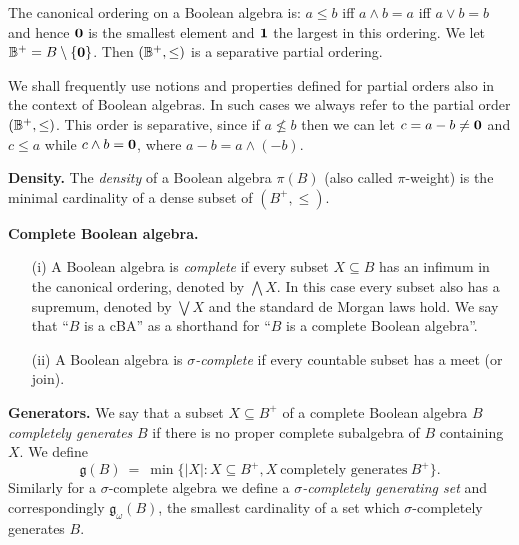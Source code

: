The canonical ordering on a Boolean algebra is: $a\leq b$ iff $a\wedge b=a$ iff $a\vee b = b$ and hence $\hbox{\bf 0}$ is the smallest element and $\hbox{\bf 1}$ the largest in this ordering.
We let ${\mathbb B}^{+}=B\setminus\{\hbox{\bf 0}\}$. Then $({\mathbb B}^{+},\leq)$ is a separative partial ordering.

\smallskip

We shall frequently use notions and properties defined for partial orders also
in the context of Boolean algebras. In such cases we always refer to the partial order
$({\mathbb B}^+,\leq)$. This order is separative, since if $a\not\leq b$
then we can let $c=a-b\neq\hbox{\bf 0}$ and $c\leq a$ while $c\wedge b=\hbox{\bf 0}$, where $a-b=a\wedge(-b)$.

\begin{definition}\label{density}{\bf Density.} The \emph{density} of a Boolean algebra $\pi(B)$ (also called $\pi$-weight) is
 the minimal cardinality of a dense subset of $(B^+,\leq)$.
\end{definition}

\begin{definition}\label{cba}
{\bf Complete Boolean algebra.}
\begin{itemize}
 \item[(i)]  A Boolean algebra is \emph{complete} %
	if every subset $X\subseteq B$ has an infimum in the canonical ordering,
	denoted by $\bigwedge X$. In this case every subset also has a supremum,
	denoted by $\bigvee X$ and the standard de Morgan laws hold.
	We say that ``$B$ is a cBA'' as a shorthand for ``$B$ is a complete Boolean algebra''.
 \item[(ii)]  A Boolean algebra is \emph{$\sigma$-complete} if every countable subset has a meet (or join).
\end{itemize}
\end{definition}

\begin{definition}\label{generators}
{\bf Generators.} We say that a subset $X\subseteq B^+$ of a complete Boolean algebra $B$
\emph{completely generates} $B$
if there is no proper complete subalgebra of $B$ containing $X$. We define
$$ %
{\mathfrak g}(B)\ =\ \min \{ |X|:X\subseteq B^+, X\ \mbox{completely generates}\ B^+\}.
$$ %
Similarly for a $\sigma$-complete algebra we define a \emph{$\sigma$-completely generating set} and correspondingly ${\mathfrak g}_\omega(B)$, the
smallest cardinality of a set which $\sigma$-completely generates $B$.
\end{definition}


